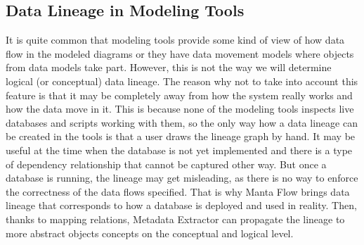 \subsection{Data Lineage in Modeling Tools}

It is quite common that modeling tools provide some kind of view of how data flow in the modeled diagrams or they have data movement models where objects from data models take part. 
However, this is not the way we will determine logical (or conceptual) data lineage.
The reason why not to take into account this feature is that it may be completely away from how the system really works and how the data move in it. 
This is because none of the modeling tools inspects live databases and scripts working with them, so the only way how a data lineage can be created in the tools is that a user draws the lineage graph by hand. 
It may be useful at the time when the database is not yet implemented and there is a type of dependency relationship that cannot be captured other way. But once a database is running, the lineage may get misleading, as there is no way to enforce the correctness of the data flows specified.
That is why Manta Flow brings data lineage that corresponds to how a database is deployed and used in reality. Then, thanks to mapping relations, Metadata Extractor can propagate the lineage to more abstract objects concepts on the conceptual and logical level.